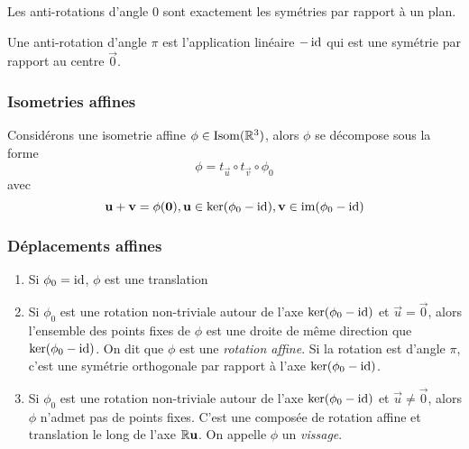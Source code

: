 \begin{remark}
	Les anti-rotations d'angle $0$ sont exactement les symétries par rapport à
	un plan.
\end{remark}

\begin{remark}
	Une anti-rotation d'angle $\pi$ est l'application linéaire $-\operatorname{id}$ qui est
	une symétrie par rapport au centre $\vec{0}$.
\end{remark}

\subsubsection{Isometries affines}

Considérons une isometrie affine $\phi \in \operatorname{Isom}(\mathbb{R}^3)$, alors $\phi$ se
décompose sous la forme
\begin{equation*}
	\phi = t_\vec{u} \circ t_\vec{v} \circ \phi_0
\end{equation*}
avec
\begin{equation*}
	\mathbf{u} + \mathbf{v} = \phi(\mathbf{0}),
	\mathbf{u} \in \ker(\phi_0 - \operatorname{id}),
	\mathbf{v} \in \operatorname{im}(\phi_0 - \operatorname{id})
\end{equation*}

\subsubsection{Déplacements affines}
\begin{enumerate}
	\item Si $\phi_0 = \operatorname{id}$, $\phi$ est une translation
	\item Si $\phi_0$ est une rotation non-triviale autour de l'axe
		$\ker(\phi_0 - \operatorname{id})$ et $\vec{u} = \vec{0}$, alors l'ensemble des points
		fixes de $\phi$ est une droite de même direction que
		$\ker(\phi_0 - \operatorname{id})$. On dit que $\phi$ est une \emph{rotation affine}.
		Si la rotation est d'angle $\pi$, c'est une 
		symétrie orthogonale par rapport à l'axe $\ker(\phi_0 - \operatorname{id})$.
	\item Si $\phi_0$ est une rotation non-triviale autour de l'axe
		$\ker(\phi_0 - \operatorname{id})$ et $\vec{u} \neq \vec{0}$, alors $\phi$ n'admet pas
		de points fixes. C'est une composée de rotation affine et translation le
		long de l'axe $\mathbb{R}\mathbf{u}$. On appelle $\phi$ un \emph{vissage}.
\end{enumerate}

